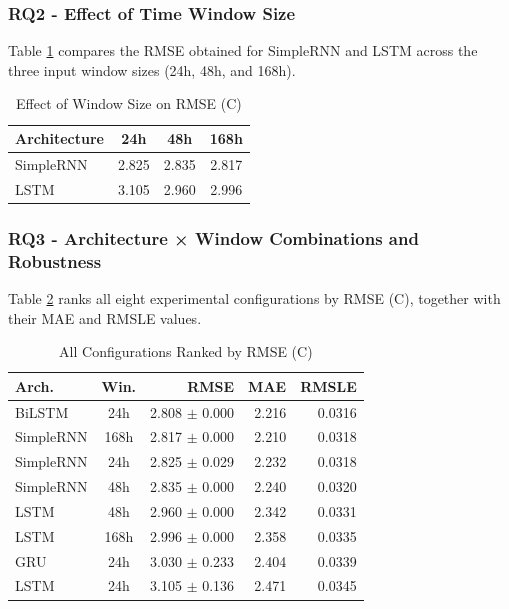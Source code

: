 \documentclass[conference]{IEEEtran}
\begin{document}
\subsubsection{RQ2 - Effect of Time Window Size}
Table \ref{tab:rq2_results} compares the RMSE obtained for SimpleRNN and LSTM across the three input window sizes (24h, 48h, and 168h).
\begin{table}[H]
\centering
\caption{Effect of Window Size on RMSE (\textdegree C)}
\label{tab:rq2_results}
\begin{tabular}{@{}lccc@{}}
\toprule
\textbf{Architecture} & \textbf{24h} & \textbf{48h} & \textbf{168h} \\
\midrule
SimpleRNN & 2.825 & 2.835 & 2.817 \\
LSTM      & 3.105 & 2.960 & 2.996 \\
\bottomrule
\end{tabular}
\end{table}
 

\subsubsection{RQ3 - Architecture × Window Combinations and Robustness}
Table \ref{tab:rq3_results} ranks all eight experimental configurations by RMSE (\textdegree C), together with their MAE and RMSLE values.
\begin{table}[H]
\centering
\caption{All Configurations Ranked by RMSE (\textdegree C)}
\label{tab:rq3_results}
\small
\begin{tabular}{@{}lcrrr@{}}
\toprule
\textbf{Arch.} & \textbf{Win.} & \textbf{RMSE} & \textbf{MAE} & \textbf{RMSLE} \\
\midrule
BiLSTM    & 24h  & 2.808 $\pm$ 0.000 & 2.216 & 0.0316 \\
SimpleRNN & 168h & 2.817 $\pm$ 0.000 & 2.210 & 0.0318 \\
SimpleRNN & 24h  & 2.825 $\pm$ 0.029 & 2.232 & 0.0318 \\
SimpleRNN & 48h  & 2.835 $\pm$ 0.000 & 2.240 & 0.0320 \\
LSTM      & 48h  & 2.960 $\pm$ 0.000 & 2.342 & 0.0331 \\
LSTM      & 168h & 2.996 $\pm$ 0.000 & 2.358 & 0.0335 \\
GRU       & 24h  & 3.030 $\pm$ 0.233 & 2.404 & 0.0339 \\
LSTM      & 24h  & 3.105 $\pm$ 0.136 & 2.471 & 0.0345 \\
\bottomrule
\end{tabular}
\end{table}
 
\end{document}
